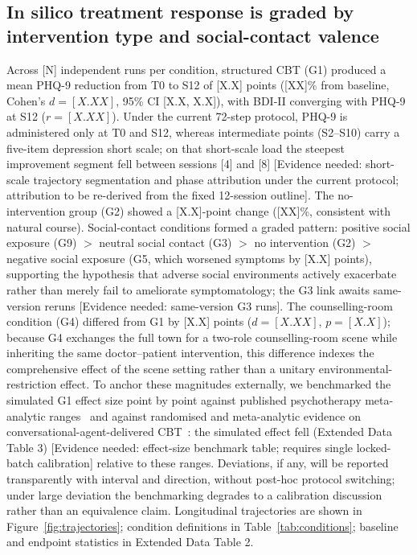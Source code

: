 \documentclass[sn-nature,pdflatex]{sn-jnl}
\begin{document}
\subsection*{In silico treatment response is graded by intervention type and social-contact valence}

Across [N] independent runs per condition, structured CBT (G1) produced a mean PHQ-9 reduction from T0 to S12 of [X.X] points ([XX]\% from baseline, Cohen's $d = [X.XX]$, 95\% CI [X.X, X.X]), with BDI-II converging with PHQ-9 at S12 ($r = [X.XX]$). Under the current 72-step protocol, PHQ-9 is administered only at T0 and S12, whereas intermediate points (S2--S10) carry a five-item depression short scale; on that short-scale load the steepest improvement segment fell between sessions [4] and [8] [Evidence needed: short-scale trajectory segmentation and phase attribution under the current protocol; attribution to be re-derived from the fixed 12-session outline]. The no-intervention group (G2) showed a [X.X]-point change ([XX]\%, consistent with natural course). Social-contact conditions formed a graded pattern: positive social exposure (G9) $>$ neutral social contact (G3) $>$ no intervention (G2) $>$ negative social exposure (G5, which worsened symptoms by [X.X] points), supporting the hypothesis that adverse social environments actively exacerbate rather than merely fail to ameliorate symptomatology; the G3 link awaits same-version reruns [Evidence needed: same-version G3 runs]. The counselling-room condition (G4) differed from G1 by [X.X] points ($d = [X.XX]$, $p = [X.X]$); because G4 exchanges the full town for a two-role counselling-room scene while inheriting the same doctor--patient intervention, this difference indexes the comprehensive effect of the scene setting rather than a unitary environmental-restriction effect. To anchor these magnitudes externally, we benchmarked the simulated G1 effect size point by point against published psychotherapy meta-analytic ranges~\cite{cuijpers2013,hofmann2012,cuijpers2020} and against randomised and meta-analytic evidence on conversational-agent-delivered CBT~\cite{heinz2025,hang2026}: the simulated effect fell (Extended Data Table 3) [Evidence needed: effect-size benchmark table; requires single locked-batch calibration] relative to these ranges. Deviations, if any, will be reported transparently with interval and direction, without post-hoc protocol switching; under large deviation the benchmarking degrades to a calibration discussion rather than an equivalence claim. Longitudinal trajectories are shown in Figure~\ref{fig:trajectories}; condition definitions in Table~\ref{tab:conditions}; baseline and endpoint statistics in Extended Data Table 2.
\end{document}
